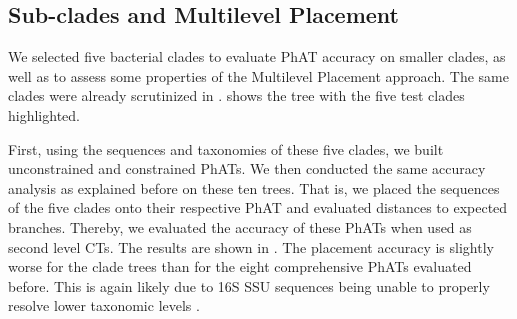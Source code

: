 
\subsection{Sub-clades and Multilevel Placement}
\label{ch:AutomaticTrees:sec:Evaluation:sub:MultilevelPlacement}

We selected five bacterial clades to evaluate \ac{PhAT} accuracy on smaller clades,
as well as to assess some properties of the Multilevel Placement approach.
The same clades were already scrutinized in  \citep{Kozlov2016}.
 shows the  tree with the five test clades highlighted.

First, using the sequences and taxonomies of these five clades, we built unconstrained and constrained \acp{PhAT}.
We then conducted the same accuracy analysis as explained before on these ten trees.
That is, we placed the  sequences of the five clades onto their respective \ac{PhAT}
and evaluated distances to expected branches.
Thereby, we evaluated the accuracy of these \acp{PhAT} when used as second level \aclp{CT}.
The results are shown in .
The placement accuracy is slightly worse for the clade trees than for the eight comprehensive \acp{PhAT} evaluated before.
This is again likely due to 16S SSU sequences being unable to properly resolve lower taxonomic levels \citep{Janda2007}.

